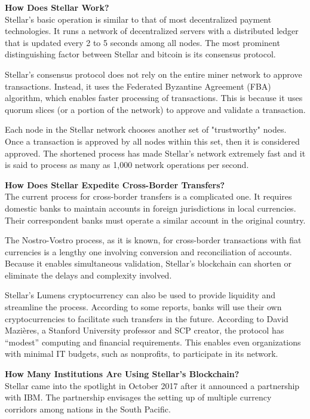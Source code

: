 \documentclass[a4paper,12pt]{/home/armando/Documentos/Cursos/LaTeX/Plantillas/lib/pub}
\begin{document}
	\textbf{How Does Stellar Work?}\\
	Stellar's basic operation is similar to that of most decentralized payment technologies. It runs a network of decentralized servers with a distributed ledger that is updated every 2 to 5 seconds among all nodes. The most prominent distinguishing factor between Stellar and bitcoin is its consensus protocol.
	
	Stellar’s consensus protocol does not rely on the entire miner network to approve transactions. Instead, it uses the Federated Byzantine Agreement (FBA) algorithm, which enables faster processing of transactions. This is because it uses quorum slices (or a portion of the network) to approve and validate a transaction. 
	
	Each node in the Stellar network chooses another set of "trustworthy" nodes. Once a transaction is approved by all nodes within this set, then it is considered approved. The shortened process has made Stellar's network extremely fast and it is said to process as many as 1,000 network operations per second. 
	
	\textbf{How Does Stellar Expedite Cross-Border Transfers?}\\ 
	The current process for cross-border transfers is a complicated one. It requires domestic banks to maintain accounts in foreign jurisdictions in local currencies. Their correspondent banks must operate a similar account in the original country.
	
	The Nostro-Vostro process, as it is known, for cross-border transactions with fiat currencies is a lengthy one involving conversion and reconciliation of accounts. Because it enables simultaneous validation, Stellar’s blockchain can shorten or eliminate the delays and complexity involved.
	
	Stellar’s Lumens cryptocurrency can also be used to provide liquidity and streamline the process. According to some reports, banks will use their own cryptocurrencies to facilitate such transfers in the future. According to David Mazières, a Stanford University professor and SCP creator, the protocol has “modest” computing and financial requirements. This enables even organizations with minimal IT budgets, such as nonprofits, to participate in its network. 
	
	\textbf{How Many Institutions Are Using Stellar’s Blockchain?}\\ 
	Stellar came into the spotlight in October 2017 after it announced a partnership with IBM. The partnership envisages the setting up of multiple currency corridors among nations in the South Pacific.
	
\end{document}
